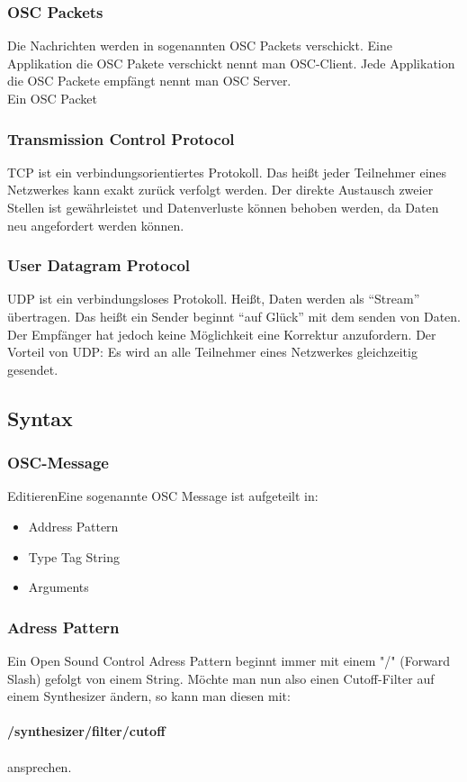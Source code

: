\documentclass[a4paper, 12pt]{article}
\begin{document}
\subsubsection{OSC Packets}
Die Nachrichten werden in sogenannten OSC Packets verschickt. Eine Applikation die OSC Pakete verschickt nennt man OSC-Client. Jede Applikation die OSC Packete empfängt nennt man OSC Server.
\\
Ein OSC Packet
\subsubsection{Transmission Control Protocol}
TCP ist ein verbindungsorientiertes Protokoll. Das heißt jeder Teilnehmer eines Netzwerkes kann exakt zurück verfolgt werden. Der direkte Austausch zweier Stellen ist gewährleistet und Datenverluste können behoben werden, da Daten neu angefordert werden können.

\subsubsection{User Datagram Protocol}
UDP ist ein verbindungsloses Protokoll. Heißt, Daten werden als “Stream” übertragen. Das heißt ein Sender beginnt “auf Glück” mit dem senden von Daten. Der Empfänger hat jedoch keine Möglichkeit eine Korrektur anzufordern. Der Vorteil von UDP: Es wird an alle Teilnehmer eines Netzwerkes gleichzeitig gesendet.
\subsection{Syntax}
\subsubsection{OSC-Message}
EditierenEine sogenannte OSC Message ist aufgeteilt in:
\begin{itemize}
  \item Address Pattern
  \item Type Tag String
  \item Arguments
\end{itemize}
\subsubsection{Adress Pattern}
Ein Open Sound Control Adress Pattern beginnt immer mit einem "/" (Forward Slash) gefolgt von einem String. Möchte man nun also einen Cutoff-Filter auf einem Synthesizer ändern, so kann man diesen mit:\\
\\
{\bf /synthesizer/filter/cutoff } \\
\\
ansprechen.
\end{document}
